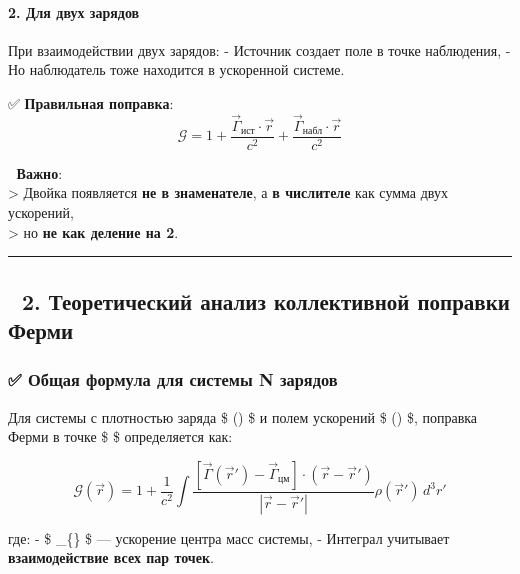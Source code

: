 \documentclass[11pt]{article}
\begin{document}
\paragraph{2. Для двух
зарядов}\label{ux434ux43bux44f-ux434ux432ux443ux445-ux437ux430ux440ux44fux434ux43eux432}

При взаимодействии двух зарядов: - Источник создает поле в точке
наблюдения, - Но наблюдатель тоже находится в ускоренной системе.

✅ \textbf{Правильная поправка}: \[
\mathcal{G} = 1 + \frac{\vec{\Gamma}_{\text{ист}} \cdot \vec{r}}{c^2} + \frac{\vec{\Gamma}_{\text{набл}} \cdot \vec{r}}{c^2}
\]

📌 \textbf{Важно}:\\
\textgreater{} Двойка появляется \textbf{не в знаменателе}, а \textbf{в
числителе} как сумма двух ускорений,\\
\textgreater{} но \textbf{не как деление на 2}.

\begin{center}\rule{0.5\linewidth}{\linethickness}\end{center}

\subsection{🔹 2. Теоретический анализ коллективной поправки
Ферми}\label{ux442ux435ux43eux440ux435ux442ux438ux447ux435ux441ux43aux438ux439-ux430ux43dux430ux43bux438ux437-ux43aux43eux43bux43bux435ux43aux442ux438ux432ux43dux43eux439-ux43fux43eux43fux440ux430ux432ux43aux438-ux444ux435ux440ux43cux438}

\subsubsection{✅ Общая формула для системы N
зарядов}\label{ux43eux431ux449ux430ux44f-ux444ux43eux440ux43cux443ux43bux430-ux434ux43bux44f-ux441ux438ux441ux442ux435ux43cux44b-n-ux437ux430ux440ux44fux434ux43eux432}

Для системы с плотностью заряда \$ \rho() \$ и полем ускорений \$
\vec{\Gamma}() \$, поправка Ферми в точке \$  \$
определяется как:

\[
\boxed{
\mathcal{G}(\vec{r}) = 1 + \frac{1}{c^2} \int \frac{[\vec{\Gamma}(\vec{r}') - \vec{\Gamma}_{\text{цм}}] \cdot (\vec{r} - \vec{r}')}{|\vec{r} - \vec{r}'|} \rho(\vec{r}') \, d^3r'
}
\]

где: - \$ \vec{\Gamma}\_\{\} \$ --- ускорение центра масс
системы, - Интеграл учитывает \textbf{взаимодействие всех пар точек}.
\end{document}
